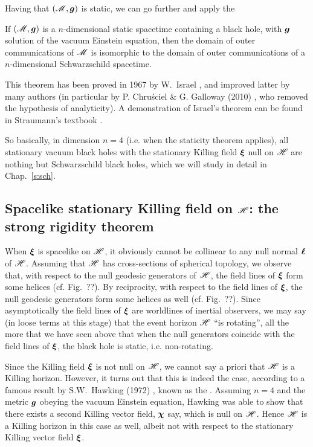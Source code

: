 Having that $(\mathscr{M},\bm{g})$ is static, we can go further and
apply the
\begin{greybox}[frametitle={Israel uniqueness theorem:}]
If $(\mathscr{M},\bm{g})$ is a $n$-dimensional static spacetime
containing a black hole, with $\bm{g}$ solution of the vacuum Einstein
equation, then the domain of outer communications of $\mathscr{M}$ is isomorphic
to the domain of outer communications of a $n$-dimensional Schwarzschild spacetime.
\end{greybox}
This theorem has been proved in 1967 by W.~Israel \cite{Israe67},
and improved latter by many authors (in particular by
P. Chru\'sciel \& G. Galloway (2010) \cite{ChrusG10}, who removed
the hypothesis of analyticity).
A demonstration of Israel's theorem can be found in Straumann's textbook \cite{Strau04}.

So basically, in dimension $n=4$ (i.e. when the staticity theorem applies), all stationary vacuum black holes with the stationary Killing field $\bm{\xi}$ null
on $\mathscr{H}$ are nothing but Schwarzschild black holes, which we will study in detail in Chap.~\ref{s:sch}.


\subsection{Spacelike stationary Killing field on $\mathscr{H}$: the strong rigidity theorem}
\label{s:sta:strong_rigidity}

When $\bm{\xi}$ is spacelike on $\mathscr{H}$, it obviously cannot be collinear to
any null normal $\bm{\ell}$ of $\mathscr{H}$.
Assuming that $\mathscr{H}$ has cross-sections of spherical topology, we observe
that, with respect to the null geodesic generators of $\mathscr{H}$, the field lines of $\bm{\xi}$
form some helices (cf. Fig.~??). By reciprocity, with respect to the field lines of $\bm{\xi}$,
the null geodesic generators form some helices as well (cf. Fig.~??).
Since asymptotically the field lines of $\bm{\xi}$ are worldlines of inertial observers,
we may say (in loose terms at this stage) that the event horizon $\mathscr{H}$
``is rotating'', all the more that we have seen above that when the null
generators coincide with the field lines of $\bm{\xi}$, the black hole is static, i.e. non-rotating.

Since the Killing field $\bm{\xi}$ is not null on $\mathscr{H}$, we cannot say a priori
that $\mathscr{H}$ is a Killing horizon. However, it turns out
that this is indeed the case, according to a famous result by S.W.~Hawking (1972)
\cite{Hawki72,HawkiE73}, known as the
.
Assuming $n=4$ and the metric $\bm{g}$ obeying the vacuum Einstein equation,
Hawking was able to show that there exists a second Killing vector field,
$\bm{\chi}$ say, which is null on $\mathscr{H}$. Hence $\mathscr{H}$ is a Killing horizon
in this case as well, albeit not with respect to the
stationary Killing vector field $\bm{\xi}$.

